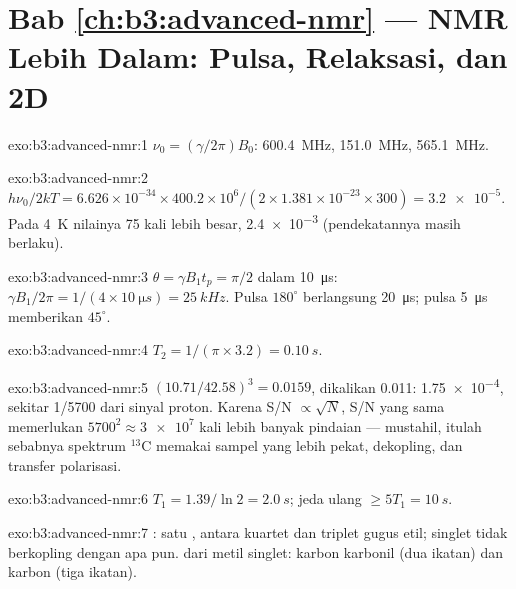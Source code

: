 \section*{Bab \ref{ch:b3:advanced-nmr} --- NMR Lebih Dalam: Pulsa, Relaksasi, dan 2D}

\begin{solution}{exo:b3:advanced-nmr:1}
$\nu_0 = (\gamma/2\pi)B_0$:  \qty{600.4}{MHz},  \qty{151.0}{MHz}, 
\qty{565.1}{MHz}.
\end{solution}

\begin{solution}{exo:b3:advanced-nmr:2}
$h\nu_0/2kT = 6.626\times10^{-34} \times 400.2\times10^6/(2 \times 1.381\times10^{-23} \times 300)
= \num{3.2e-5}$. Pada \qty{4}{K} nilainya 75 kali lebih besar, \num{2.4e-3}
(pendekatannya masih berlaku).
\end{solution}

\begin{solution}{exo:b3:advanced-nmr:3}
$\theta = \gamma B_1t_p = \pi/2$ dalam \qty{10}{\micro s}: $\gamma B_1/2\pi = 1/(4 \times
\qty{10}{\micro s}) = \qty{25}{kHz}$. Pulsa $180^\circ$ berlangsung \qty{20}{\micro s};
pulsa \qty{5}{\micro s} memberikan $45^\circ$.
\end{solution}

\begin{solution}{exo:b3:advanced-nmr:4}
$T_2 = 1/(\pi \times 3.2) = \qty{0.10}{s}$.
\end{solution}

\begin{solution}{exo:b3:advanced-nmr:5}
$(10.71/42.58)^3 = 0.0159$, dikalikan 0.011: \num{1.75e-4}, sekitar 1/5700 dari
sinyal proton. Karena S/N $\propto\sqrt N$, S/N yang sama memerlukan
$5700^2 \approx \num{3e7}$ kali lebih banyak pindaian --- mustahil, itulah
sebabnya spektrum ${}^{13}$C memakai sampel yang lebih pekat, dekopling, dan
transfer polarisasi.
\end{solution}

\begin{solution}{exo:b3:advanced-nmr:6}
$T_1 = 1.39/\ln2 = \qty{2.0}{s}$; jeda ulang $\ge 5T_1 = \qty{10}{s}$.
\end{solution}

\begin{solution}{exo:b3:advanced-nmr:7}
: satu , antara kuartet  dan triplet  gugus
etil; singlet  tidak berkopling dengan apa pun.  dari metil
singlet: karbon karbonil (dua ikatan) dan karbon  (tiga ikatan).
\end{solution}

